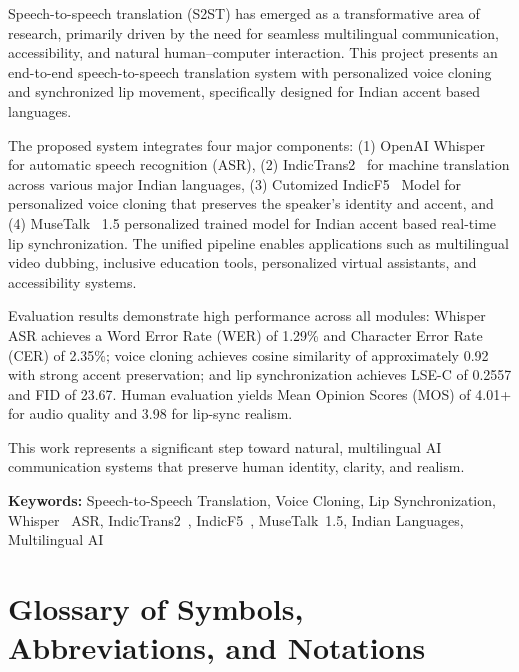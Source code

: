 \documentclass[12pt,oneside]{report}
\begin{document}
Speech-to-speech translation (S2ST) has emerged as a transformative area of research, primarily driven by the need for seamless multilingual communication, accessibility, and natural human--computer interaction. This project presents an end-to-end speech-to-speech translation system with personalized voice cloning and synchronized lip movement, specifically designed for Indian accent based languages.

The proposed system integrates four major components: (1) OpenAI Whisper~\cite{radford2023whisper} for automatic speech recognition (ASR), (2) IndicTrans2~\cite{gala2023indictrans2} for machine translation across various major Indian languages, (3) Cutomized IndicF5~\cite{indicf5_2025} Model for personalized voice cloning that preserves the speaker's identity and accent, and (4) MuseTalk~\cite{zhang2023musetalk} 1.5 personalized trained model for Indian accent based real-time lip synchronization. The unified pipeline enables applications such as multilingual video dubbing, inclusive education tools, personalized virtual assistants, and accessibility systems.

Evaluation results demonstrate high performance across all modules: Whisper~\cite{radford2023whisper} ASR achieves a Word Error Rate (WER) of 1.29\% and Character Error Rate (CER) of 2.35\%; voice cloning achieves cosine similarity of approximately 0.92 with strong accent preservation; and lip synchronization achieves LSE-C of 0.2557 and FID of 23.67. Human evaluation yields Mean Opinion Scores (MOS) of 4.01+ for audio quality and 3.98 for lip-sync realism.

This work represents a significant step toward natural, multilingual AI communication systems that preserve human identity, clarity, and realism.

\textbf{Keywords:} Speech-to-Speech Translation, Voice Cloning, Lip Synchronization, Whisper~\cite{radford2023whisper} ASR, IndicTrans2~\cite{gala2023indictrans2}, IndicF5~\cite{indicf5_2025}, MuseTalk~\cite{zhang2023musetalk}1.5, Indian Languages, Multilingual AI

\newpage


\tableofcontents
\newpage
\listoffigures
\newpage
\listoftables
\newpage
\chapter*{Glossary of Symbols, Abbreviations, and Notations}
\label{ch:glossary}
\end{document}

